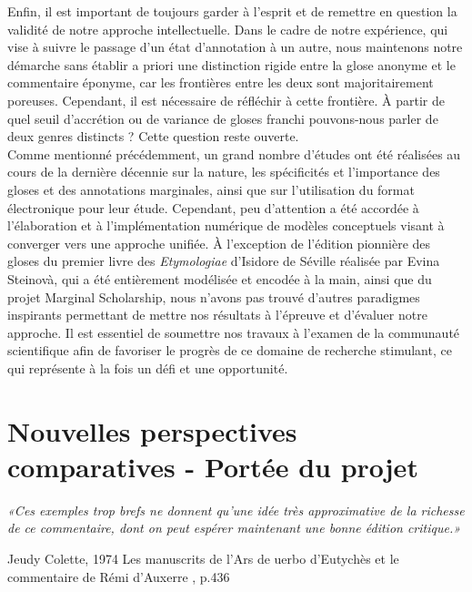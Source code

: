 \documentclass[a4paper, twoside, 12pt]{book}
\begin{document}
{Enfin, il est important de toujours garder à l'esprit et de remettre en question la validité de notre approche intellectuelle. Dans le cadre de notre expérience, qui vise à suivre le passage d'un état d'annotation à un autre, nous maintenons notre démarche sans établir a priori une distinction rigide entre la glose anonyme et le commentaire éponyme, car les frontières entre les deux sont majoritairement poreuses. Cependant, il est nécessaire de réfléchir à cette frontière. À partir de quel seuil d'accrétion ou de variance de gloses franchi pouvons-nous parler de deux \og{}genres\fg{} distincts ? Cette question reste ouverte.\\


Comme mentionné précédemment, un grand nombre d'études ont été réalisées au cours de la dernière décennie sur la nature, les spécificités et l'importance des gloses et des annotations marginales, ainsi que sur l'utilisation du format électronique pour leur étude. Cependant, peu d'attention a été accordée à l'élaboration et à l'implémentation numérique de modèles conceptuels visant à converger vers une approche unifiée. À l'exception de l'édition pionnière des gloses du premier livre des \textit{Etymologiae} d'Isidore de Séville réalisée par Evina Steinovà, qui a été entièrement modélisée et encodée à la main, ainsi que du projet \og{}Marginal Scholarship\fg{}, nous n'avons pas trouvé d'autres paradigmes inspirants permettant de mettre nos résultats à l'épreuve et d'évaluer notre approche. Il est essentiel de soumettre nos travaux à l'examen de la communauté scientifique afin de favoriser le progrès de ce domaine de recherche stimulant, ce qui représente à la fois un défi et une opportunité.\\

\section{Nouvelles perspectives comparatives - Portée du projet}


\begin{flushright}\textit{ «Ces exemples  trop  brefs ne  donnent  qu'une  idée  très  approximative  de la richesse de ce commentaire, dont on peut espérer maintenant une bonne édition critique.»}\end{flushright}

\begin{flushright}Jeudy Colette, 1974 \og{} Les manuscrits de l’Ars de uerbo d’Eutychès et le commentaire de Rémi d’Auxerre \fg{}, p.436 \end{flushright}

}
\end{document}

